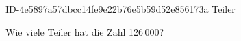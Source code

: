 \begin{exercise}
      {ID-4e5897a57dbcc14fe9e22b76e5b59d52e856173a}
      {Teiler}
  \ifproblem\problem\par
    Wie viele Teiler hat die Zahl 126\,000?
  \fi
\end{exercise}

